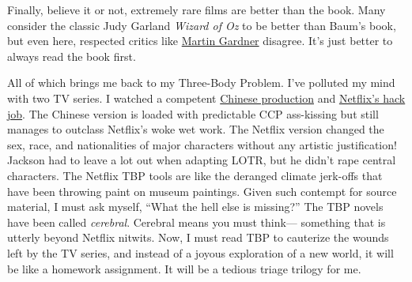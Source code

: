 Finally, believe it or not, extremely rare films are
better than the book. Many consider the classic Judy Garland
\emph{Wizard of Oz} to be better than Baum's book, but even here,
respected critics like \href{https://www.goodreads.com/book/show/1125174.The_Wizard_of_Oz_and_Who_He_Was}{Martin Gardner} disagree.
It's just better to always read the book first.

All of which brings me back to my Three-Body Problem. I've polluted my
mind with two TV series. I watched a competent
\href{https://en.wikipedia.org/wiki/Three-Body}{Chinese production} and
\href{https://www.netflix.com/title/81024821}{Netflix's hack job}. The
Chinese version is loaded with predictable CCP ass-kissing but still
manages to outclass Netflix's woke wet work. The Netflix version changed
the sex, race, and nationalities of major characters without any
artistic justification! Jackson had to leave a lot out when adapting
LOTR, but he didn't rape central characters. The Netflix TBP tools are
like the deranged climate jerk-offs that have been throwing paint on
museum paintings. Given such contempt for source material, I must ask
myself, ``What the hell else is missing?'' The TBP novels have been
called \emph{cerebral}. Cerebral means you must think--- something that
is utterly beyond Netflix nitwits. Now, I must read TBP to cauterize the
wounds left by the TV series, and instead of a joyous exploration of a
new world, it will be like a homework assignment. It will be a
tedious triage trilogy for me.

%
 

